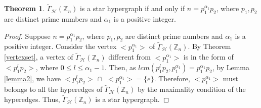 \documentclass[11pt,a4paper]{article}
\theoremstyle{definition}
\newtheorem{theorem}{Theorem}[section]
\theoremstyle{remark}
\begin{document}
	\begin{theorem}\label{starhyp}
		$\tilde{\Gamma}_\mathcal{H}(\mathbb{Z}_n)$ is a star hypergraph  if and only if $n=p_1^{\alpha_1} p_2$, where $p_1,p_2$ are distinct prime numbers and $\alpha_1$ is a positive integer.
	\end{theorem}
	\begin{proof}
	Suppose $n=p_1^{\alpha_1} p_2$, where $p_1,p_2$ are distinct prime numbers and $\alpha_1$ is a positive integer. Consider the vertex $<p_1^{\alpha_1}>$ of $\tilde{\Gamma}_\mathcal{H}(\mathbb{Z}_n)$. By Theorem \ref{vertexset}, a vertex of $\tilde{\Gamma}_\mathcal{H}(\mathbb{Z}_n)$ different from $<p_1^{\alpha_1}>$ is in the form of $<p_1^l p_2>$, where $0 \leq l \leq \alpha_1-1$.   Then, as $lcm(p_1^{l}p_2,p_1^{\alpha_1})=p_1^{\alpha_1} p_2$, by Lemma \ref{lemma2}, we have $<p_1^l p_2> \, \cap $ $<p_1^{\alpha_1}> =\{e\}$. 
Therefore,  $<p_1^{\alpha_1}>$ must belongs to all the hyperedges of $\tilde{\Gamma}_\mathcal{H}(\mathbb{Z}_n)$ by the maximality condition of the hyperedges. Thus, $\tilde{\Gamma}_\mathcal{H}(\mathbb{Z}_n)$ is a star hypergraph.
	
	
	

\end{proof}
\end{document}
